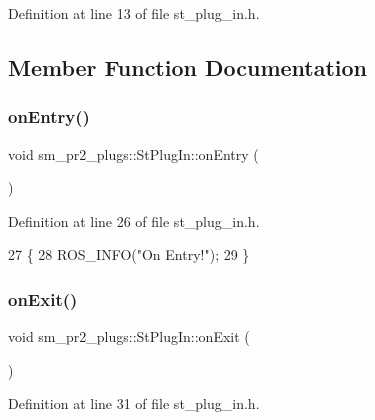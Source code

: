 Definition at line 13 of file st\+\_\+plug\+\_\+in.\+h.



\subsection{Member Function Documentation}
\mbox{\label{structsm__pr2__plugs_1_1StPlugIn_a8d3fdf50ab08b1692c7bb38a158cf356}} 
\subsubsection{\texorpdfstring{on\+Entry()}{onEntry()}}
{\footnotesize\ttfamily void sm\+\_\+pr2\+\_\+plugs\+::\+St\+Plug\+In\+::on\+Entry (\begin{DoxyParamCaption}{ }\end{DoxyParamCaption})\hspace{0.3cm}{\ttfamily [inline]}}



Definition at line 26 of file st\+\_\+plug\+\_\+in.\+h.


\begin{DoxyCode}
27     \{
28         ROS\_INFO(\textcolor{stringliteral}{"On Entry!"});
29     \}
\end{DoxyCode}
\mbox{\label{structsm__pr2__plugs_1_1StPlugIn_a80a329049d6600f26e662fbdfc65a02e}} 
\subsubsection{\texorpdfstring{on\+Exit()}{onExit()}}
{\footnotesize\ttfamily void sm\+\_\+pr2\+\_\+plugs\+::\+St\+Plug\+In\+::on\+Exit (\begin{DoxyParamCaption}{ }\end{DoxyParamCaption})\hspace{0.3cm}{\ttfamily [inline]}}



Definition at line 31 of file st\+\_\+plug\+\_\+in.\+h.


